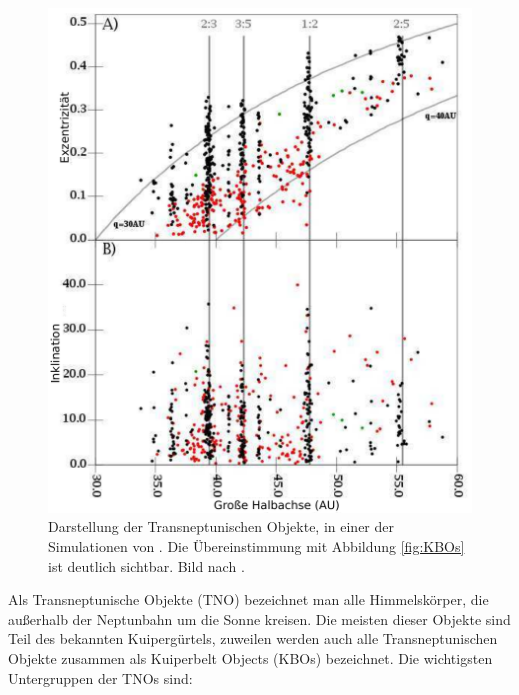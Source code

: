 \documentclass[12pt,a4paper,twoside]{article}
\renewcommand{\cite}{\citep}
\begin{document}
\begin{figure}
\centering 
\includegraphics[scale=0.7]{img/LEVISON2008-6-mod}
\caption{Darstellung der Transneptunischen Objekte, in einer der Simulationen von \cite{Levison2008}. Die Übereinstimmung mit Abbildung \ref{fig:KBOs} ist deutlich sichtbar. Bild nach \cite{Levison2008}.}
\label{fig:KBOs_sim}
\end{figure}
Als Transneptunische Objekte (TNO) bezeichnet man alle Himmelskörper, die außerhalb der Neptunbahn um die Sonne kreisen. Die meisten dieser Objekte sind Teil des bekannten Kuipergürtels, zuweilen werden auch alle Transneptunischen Objekte zusammen als Kuiperbelt Objects (KBOs) bezeichnet.
Die wichtigsten Untergruppen der TNOs sind:
\end{document}
